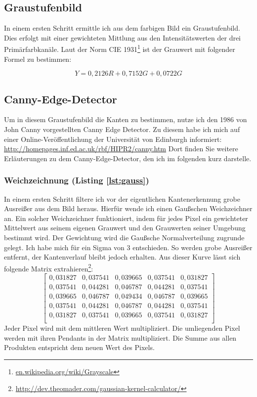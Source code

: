 \subsection{Graustufenbild}
In einem ersten Schritt ermittle ich aus dem farbigen Bild ein Graustufenbild. Dies erfolgt mit einer gewichteten Mittlung aus den Intensitätswerten der drei Primärfarbkanäle. Laut der Norm CIE 1931\footnote{\url{en.wikipedia.org/wiki/Grayscale}} ist der Grauwert mit folgender Formel zu bestimmen:

\begin{equation}
Y = 0,2126R+0,7152G+0,0722G
\end{equation}

\subsection{Canny-Edge-Detector}
Um in diesem Graustufenbild die Kanten zu bestimmen, nutze ich den 1986 von John Canny vorgestellten Canny Edge Detector. Zu diesem habe ich mich auf einer Online-Veröffentlichung der Universität von Edinburgh informiert: \url{http://homepages.inf.ed.ac.uk/rbf/HIPR2/canny.htm} Dort finden Sie weitere Erläuterungen zu dem Canny-Edge-Detector, den ich im folgenden kurz darstelle.

\subsubsection{Weichzeichnung (Listing \ref{lst:gauss})}
In einem ersten Schritt filtere ich vor der eigentlichen Kantenerkennung grobe Ausreißer aus dem Bild heraus. Hierfür wende ich einen Gaußschen Weichzeichner an. Ein solcher Weichzeichner funktioniert, indem für jedes Pixel ein gewichteter Mittelwert aus seinem eigenen Grauwert und den Grauwerten seiner Umgebung bestimmt wird. Der Gewichtung wird die Gaußsche Normalverteilung zugrunde gelegt. Ich habe mich für ein Sigma von 3 entschieden. So werden grobe Ausreißer entfernt, der Kantenverlauf bleibt jedoch erhalten. Aus dieser Kurve lässt sich folgende Matrix extrahieren\footnote{\url{http://dev.theomader.com/gaussian-kernel-calculator/}}:
\begin{equation}
	\begin{bmatrix}
	0,031827&0,037541&0,039665&0,037541&0,031827 \\
	0,037541&0,044281&0,046787&0,044281&0,037541 \\
	0,039665&0,046787&0,049434&0,046787&0,039665 \\
	0,037541&0,044281&0,046787&0,044281&0,037541 \\
	0,031827&0,037541&0,039665&0,037541&0,031827 \\
	\end{bmatrix}
\end{equation}
Jeder Pixel wird mit dem mittleren Wert multipliziert. Die umliegenden Pixel werden mit ihren Pendants in der Matrix multipliziert. Die Summe aus allen Produkten entspricht dem neuen Wert des Pixels.

